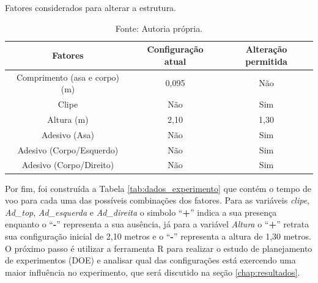 \begin{table}[H]
  \caption{Fatores considerados para alterar a estrutura.}
  \centering
  \begin{tabular}{|c|c|c|}
  \hline
  \rowcolor[HTML]{EFEFEF} 
  \textbf{Fatores}              & \textbf{Configuração atual} & \textbf{Alteração permitida} \\ \hline
  Comprimento (asa e corpo) (m) & 0,095                       & Não                          \\ \hline
  \rowcolor[HTML]{EFEFEF} 
  Clipe                         & Não                         & Sim                          \\ \hline
  \rowcolor[HTML]{FFFFFF} 
  Altura (m)                    & 2,10                        & 1,30                         \\ \hline
  \rowcolor[HTML]{EFEFEF} 
  Adesivo (Asa)                 & Não                         & Sim                          \\ \hline
  \rowcolor[HTML]{FFFFFF} 
  Adesivo (Corpo/Esquerdo)         & Não                         & Sim                          \\ \hline
  \rowcolor[HTML]{EFEFEF} 
  Adesivo (Corpo/Direito)          & Não                         & Sim                          \\ \hline
  \end{tabular}
  \caption*{Fonte: Autoria própria.}
  \label{tab:fatores}
  \end{table}

Por fim, foi construída a Tabela \ref{tab:dados_experimento} que contém o tempo de voo para cada uma das possíveis combinações dos fatores. Para as variáveis \textit{clipe}, \textit{Ad\_top}, \textit{Ad\_esquerda} e \textit{Ad\_direita} o simbolo ``\textbf{+}'' indica a sua presença enquanto o ``\textbf{-}'' representa a sua ausência, já para a variável \textit{Altura} o ``\textbf{+}'' retrata sua configuração inicial de 2,10 metros e o ``\textbf{-}'' representa a altura de 1,30 metros. O próximo passo é utilizar a ferramenta R para realizar o estudo de planejamento de experimentos (DOE) e analisar qual das configurações está exercendo uma maior influência no experimento, que será discutido na seção \ref{chap:resultados}.

